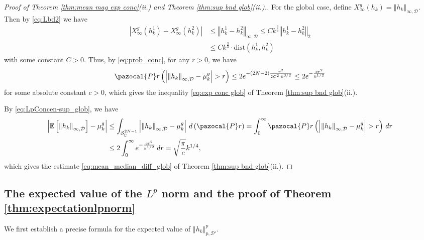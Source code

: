 \documentclass[12pt, a4paper]{amsart}
\theoremstyle{definition}
\newcommand {\1} {\mathbf{1}}
\newcommand{\prob}{\pazocal{P}r}
\newcommand {\Dc} {\mathcal{D}}
\newcommand{\Scc}{{\mathcal{S}}}
\numberwithin{equation}{section}
\begin{document}
\begin{proof}[Proof of Theorem \ref{thm:mean mag exp conc}(ii.) and Theorem \ref{thm:sup bnd glob}(ii.).]
For the global case, define $X_{\infty}^g\left(h_{k}\right)=\left\Vert h_{k}\right\Vert _{\infty,\Dc}$. Then by \eqref{eq:Lbd2} we have
\begin{align*}
\left|X^g_{\infty}\left(h_{k}^{1}\right)-X^g_{\infty}\left(h_{k}^{2}\right)\right| & \le\left\Vert h_{k}^{1}-h_{k}^{2}\right\Vert _{\infty,\Dc}\le Ck^{\frac{3}{4}}\left\Vert h_{k}^{1}-h_{k}^{2}\right\Vert _{2}\\
 & \le Ck^{\frac{3}{4}}\cdot \text{dist}\left(h_{k}^{1},h_{k}^{2}\right)
\end{align*}
with some constant $C>0$. Thus, by \eqref{eq:prob_conc},
for any $r>0$, we have
\begin{equation} 
\prob\left(\left|\left\Vert h_{k}\right\Vert _{\infty,\Dc}-\mu^g_{k}\right|>r\right)\le
2e^{-\left(2N-2\right)\frac{r^{2}}{2C^{2}\cdot k^{3/2}}}\le2e^{-\frac{cr^{2}}{k^{1/2}}}\label{eq:LpConcen-sup_glob}
\end{equation}
for some absolute constant $c>0$, which gives the inequality \eqref{eq:exp conc glob} of Theorem \ref{thm:sup bnd glob}(ii.).

By \eqref{eq:LpConcen-sup_glob}, we have
\begin{align*}
\left|\mathbb{E}\left[\left\Vert h_{k}\right\Vert _{\infty,\Dc}\right]-\mu^g_{k}\right| & \le\int_{\Scc_{\mathbb{C}}^{2N-1}}\left|\left\Vert h_{k}\right\Vert _{\infty,\Dc}-\mu^g_{k}\right|\,d\left(\prob\right)=\int_{0}^{\infty}\prob\left(\left|\left\Vert h_{k}\right\Vert _{\infty,\Dc}-\mu^g_{k}\right|>r\right)\,dr\\
 & \le2\int_{0}^{\infty}e^{-\frac{cr^{2}}{k^{1/2}}}\,dr=\sqrt{\frac{\pi}{c}}k^{1/4},
\end{align*}
which gives the estimate \eqref{eq:mean_median_diff_glob} of Theorem  \ref{thm:sup bnd glob}(ii.).
\end{proof}
%

\subsection{The expected value of the \texorpdfstring{$L^p$}{Lp} norm and the proof of Theorem \ref{thm:expectationlpnorm}}
\label{sec:lower bnd exp proc}

We first establish a precise formula for the expected value of 
$\left\Vert h_{k} \right\Vert_{p, \mathcal D'}^p$.
\end{document}
